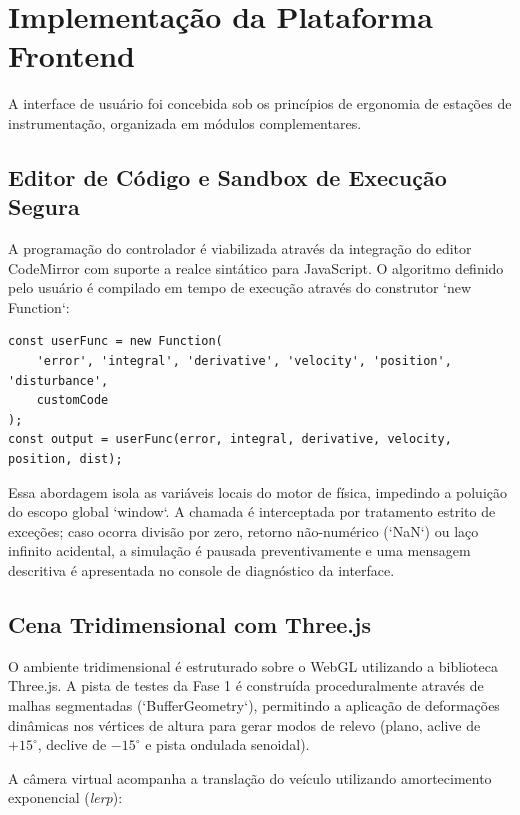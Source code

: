 \section{Implementação da Plataforma Frontend}
\label{sec:implementacao_frontend}

A interface de usuário foi concebida sob os princípios de ergonomia de estações de instrumentação, organizada em módulos complementares.

\subsection{Editor de Código e Sandbox de Execução Segura}
\label{subsec:editor_sandbox}

A programação do controlador é viabilizada através da integração do editor CodeMirror com suporte a realce sintático para JavaScript. O algoritmo definido pelo usuário é compilado em tempo de execução através do construtor `new Function`:

\begin{verbatim}
const userFunc = new Function(
    'error', 'integral', 'derivative', 'velocity', 'position', 'disturbance',
    customCode
);
const output = userFunc(error, integral, derivative, velocity, position, dist);
\end{verbatim}

Essa abordagem isola as variáveis locais do motor de física, impedindo a poluição do escopo global `window`. A chamada é interceptada por tratamento estrito de exceções; caso ocorra divisão por zero, retorno não-numérico (`NaN`) ou laço infinito acidental, a simulação é pausada preventivamente e uma mensagem descritiva é apresentada no console de diagnóstico da interface.

\subsection{Cena Tridimensional com Three.js}
\label{subsec:cena_threejs}

O ambiente tridimensional é estruturado sobre o WebGL utilizando a biblioteca Three.js. A pista de testes da Fase 1 é construída proceduralmente através de malhas segmentadas (`BufferGeometry`), permitindo a aplicação de deformações dinâmicas nos vértices de altura para gerar modos de relevo (plano, aclive de $+15^\circ$, declive de $-15^\circ$ e pista ondulada senoidal).

A câmera virtual acompanha a translação do veículo utilizando amortecimento exponencial (\textit{lerp}):

